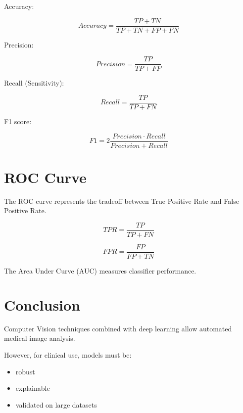 \documentclass[11pt]{article}
\begin{document}
Accuracy:

\[
Accuracy =
\frac{TP + TN}{TP + TN + FP + FN}
\]

Precision:

\[
Precision =
\frac{TP}{TP + FP}
\]

Recall (Sensitivity):

\[
Recall =
\frac{TP}{TP + FN}
\]

F1 score:

\[
F1 =
2\frac{Precision \cdot Recall}{Precision + Recall}
\]

\section{ROC Curve}

The ROC curve represents the tradeoff between
True Positive Rate and False Positive Rate.

\[
TPR =
\frac{TP}{TP + FN}
\]

\[
FPR =
\frac{FP}{FP + TN}
\]

The Area Under Curve (AUC) measures classifier performance.

\section{Conclusion}

Computer Vision techniques combined with deep learning allow automated medical image analysis.

However, for clinical use, models must be:

\begin{itemize}
\item robust
\item explainable
\item validated on large datasets
\end{itemize}
\end{document}

